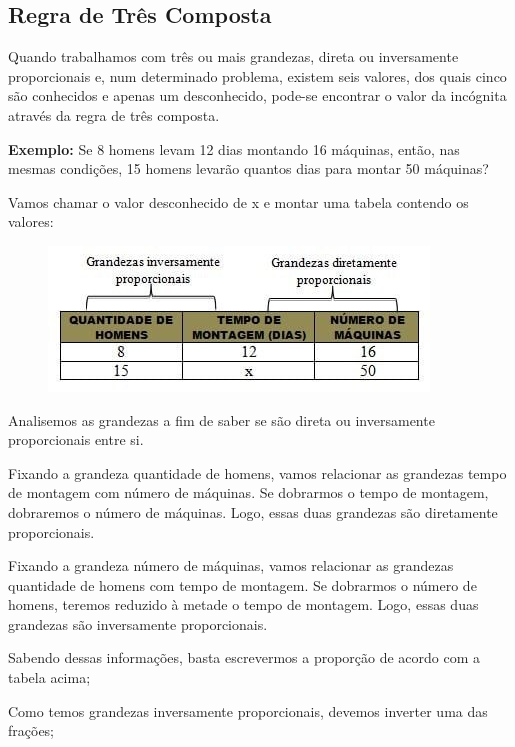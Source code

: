 \begin{multicols*}{2}
	\subsection{Regra de Três Composta}

	Quando trabalhamos com três ou mais grandezas, direta ou inversamente proporcionais e, num determinado problema, existem seis valores, dos quais cinco são conhecidos e apenas um desconhecido, pode-se encontrar o valor da incógnita através da regra de três composta.

	\textbf{Exemplo:} Se 8 homens levam 12 dias montando 16 máquinas, então, nas mesmas condições, 15 homens levarão quantos dias para montar 50 máquinas?

	Vamos chamar o valor desconhecido de x e montar uma tabela contendo os valores:

	\begin{figure}[H]
		\centering
		\includegraphics[width=\columnwidth]{assets/R3composta.jpg}
	\end{figure}

	Analisemos as grandezas a fim de saber se são direta ou inversamente proporcionais entre si.

	Fixando a grandeza quantidade de homens, vamos relacionar as grandezas tempo de montagem com número de máquinas. Se dobrarmos o tempo de montagem, dobraremos o número de máquinas. Logo, essas duas grandezas são diretamente proporcionais.

	Fixando a grandeza número de máquinas, vamos relacionar as grandezas quantidade de homens com tempo de montagem. Se dobrarmos o número de homens, teremos reduzido à metade o tempo de montagem. Logo, essas duas grandezas são inversamente proporcionais.

	Sabendo dessas informações, basta escrevermos a proporção de acordo com a tabela acima;

	Como temos grandezas inversamente proporcionais, devemos inverter uma das frações;


\end{multicols*}
